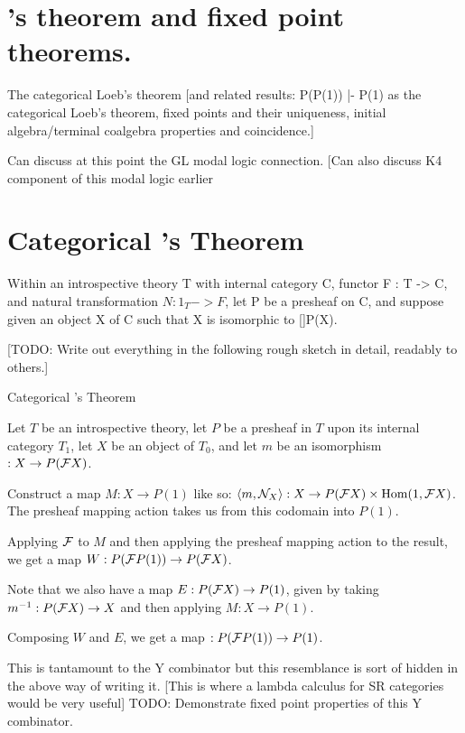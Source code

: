 \section{\Loeb's theorem and fixed point theorems.}

The categorical Loeb’s theorem [and related results: P(P(1)) |- P(1) as the categorical Loeb’s theorem, fixed points and their uniqueness, initial algebra/terminal coalgebra properties and coincidence.]

Can discuss at this point the GL modal logic connection. [Can also discuss K4 component of this modal logic earlier

\section{Categorical \Loeb's Theorem}
Within an introspective theory T with internal category C, functor F : T -> C, and natural transformation $N : 1_T -> F$, let P be a presheaf on C, and suppose given an object X of C such that X is isomorphic to []P(X).

[TODO: Write out everything in the following rough sketch in detail, readably to others.]

\begin{theorem}
Categorical \Loeb's Theorem
\end{theorem}
Let $T$ be an introspective theory, let $P$ be a presheaf in $T$ upon its internal category $T_1$, let $X$ be an object of $T_0$, and let $m$ be an isomorphism $: X \to P(\mathcal{F} X)$.

Construct a map $M : X \to P(1)$ like so: $\langle m, \mathcal{N}_X \rangle : X \to P(\mathcal{F} X) \times \mathrm{Hom}(1, \mathcal{F} X)$. The presheaf mapping action takes us from this codomain into $P(1)$.

Applying $\mathcal{F}$ to $M$ and then applying the presheaf mapping action to the result, we get a map $W : P(\mathcal{F} P(1)) \to P(\mathcal{F} X)$.

Note that we also have a map $E : P(\mathcal{F} X) \to P(1)$, given by taking $m^{-1} : P(\mathcal{F} X) \to X$ and then applying $M : X \to P(1)$.

Composing $W$ and $E$, we get a map $: P(\mathcal{F} P(1)) \to P(1)$.

This is tantamount to the Y combinator but this resemblance is sort of hidden in the above way of writing it. [This is where a lambda calculus for SR categories would be very useful] TODO: Demonstrate fixed point properties of this Y combinator.

